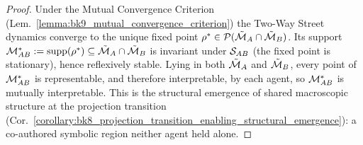 \begin{proof}
\label{proof:bk9_emergence_of_shared_manifold}
\leavevmode
Under the Mutual Convergence Criterion (Lem.~\ref{lemma:bk9_mutual_convergence_criterion}) the Two-Way Street dynamics converge to the unique fixed point $\rho^*\in\mathcal{P}(\tilde{\mathcal{M}}_A\cap\tilde{\mathcal{M}}_B)$. Its support $\mathcal{M}_{AB}^*:=\operatorname{supp}(\rho^*)\subseteq\tilde{\mathcal{M}}_A\cap\tilde{\mathcal{M}}_B$ is invariant under $\mathcal{S}_{AB}$ (the fixed point is stationary), hence reflexively stable. Lying in both $\tilde{\mathcal{M}}_A$ and $\tilde{\mathcal{M}}_B$, every point of $\mathcal{M}_{AB}^*$ is representable, and therefore interpretable, by each agent, so $\mathcal{M}_{AB}^*$ is mutually interpretable. This is the structural emergence of shared macroscopic structure at the projection transition (Cor.~\ref{corollary:bk8_projection_transition_enabling_structural_emergence}): a co-authored symbolic region neither agent held alone.
\end{proof}
